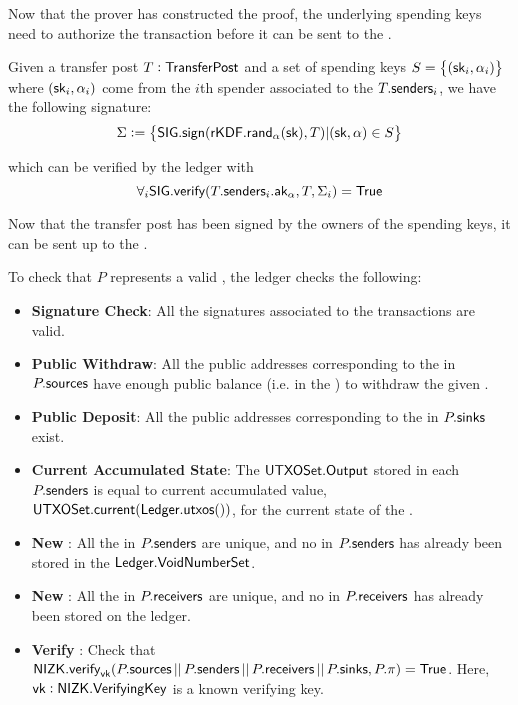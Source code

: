 Now that the prover has constructed the proof, the underlying spending keys need to authorize the transaction before it can be sent to the \Ledger{}.

\begin{definition}
    Given a transfer post $T: {\textsf{TransferPost}}{}$ and a set of spending keys $S = \set{({\textsf{sk}}_i, \alpha_i)}$ where $({\textsf{sk}}_i, \alpha_i)$ come from the $i$th spender associated to the $T.{\textsf{senders}}_i$, we have the following signature:
    \[\Sigma := \set{{\textsf{SIG}}.{\textsf{sign}}({\textsf{rKDF}}.{\textsf{rand}}_\alpha({\textsf{sk}}), T) | ({\textsf{sk}}, \alpha) \in S}\]

    which can be verified by the ledger with 
    \[\forall_i{\textsf{SIG}}.{\textsf{verify}}(T.{\textsf{senders}}_i.{\textsf{ak}}_\alpha, T, \Sigma_i) = {\textsf{True}}\]
\end{definition}

Now that the transfer post has been signed by the owners of the spending keys, it can be sent up to the \Ledger{}.

\begin{definition}
    To check that $P$ represents a valid \Transfer{}, the ledger checks the following:
    \begin{itemize}
        \item \textbf{Signature Check}: All the signatures associated to the transactions are valid.
        \item \textbf{Public Withdraw}: All the public addresses corresponding to the  in $P.{\textsf{sources}}$ have enough public balance (i.e. in the \PublicLedger{}) to withdraw the given \Asset{}.
        \item \textbf{Public Deposit}: All the public addresses corresponding to the  in $P.{\textsf{sinks}}$ exist.
        \item \textbf{Current Accumulated State}: The ${\textsf{UTXOSet}}.{\textsf{Output}}$ stored in each $P.{\textsf{senders}}$ is equal to current accumulated value, ${\textsf{UTXOSet}}.{\textsf{current}}({\textsf{Ledger}}.{\textsf{utxos}}())$, for the current state of the \Ledger{}.
        \item \textbf{New }: All the  in $P.{\textsf{senders}}$ are unique, and no \VoidNumber{} in $P.{\textsf{senders}}$ has already been stored in the ${\textsf{Ledger}}.{\textsf{VoidNumberSet}}$.
        \item \textbf{New }: All the  in $P.{\textsf{receivers}}$ are unique, and no \UTXO{} in $P.{\textsf{receivers}}$ has already been stored on the ledger.
        \item \textbf{Verify \Transfer{}}: Check that ${\textsf{NIZK}}.{\textsf{verify}}_{\textsf{vk}}(P.{\textsf{sources}} \,||\, P.{\textsf{senders}} \,||\, P.{\textsf{receivers}} \,||\, P.{\textsf{sinks}}, P.\pi) = {\textsf{True}}$. Here, ${\textsf{vk}} : {\textsf{NIZK}}.{\textsf{VerifyingKey}}$ is a known verifying key.
    \end{itemize}
\end{definition}

